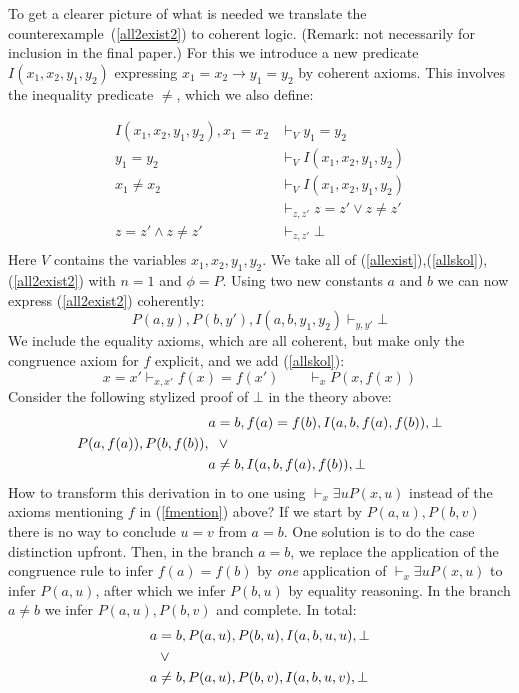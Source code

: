 \documentclass[10pt,a4paper]{article}
\begin{document}
To get a clearer picture of what is needed we translate the 
counterexample~(\ref{all2exist2}) to coherent logic.
(Remark: not necessarily for inclusion in the final paper.)
For this we introduce a new predicate $I(x_1,x_2,y_1,y_2)$
expressing $x_1=x_2 \to y_1=y_2$ by coherent axioms.
This involves the inequality predicate ${\neq}$, which we also define:

\begin{align*}
 I(x_1,x_2,y_1,y_2), x_1=x_2 & \vdash_V                 y_1=y_2\\
 y_1=y_2                                  &\vdash_V                 I(x_1,x_2,y_1,y_2)\\ 
 x_1\neq x_2                           &\vdash_V                 I(x_1,x_2,y_1,y_2)\\
                                                 &\vdash_{z,z'}           z=z' \lor z\neq z'\\
 z=z' \land z\neq z'                &\vdash_{z,z'}           \bot\\
\end{align*}
Here $V$ contains the variables $x_1,x_2,y_1,y_2$.
We take all of (\ref{allexist}),(\ref{allskol}),(\ref{all2exist2})
with $n=1$ and $\phi=P$.
Using two new constants $a$ and $b$ we can now express (\ref{all2exist2}) coherently:
\[
P(a,y),P(b,y'),I(a,b,y_1,y_2)  \vdash_{y,y'} \bot
\]
We include the equality axioms, which are all coherent, but make only the
congruence axiom for $f$ explicit, and we add (\ref{allskol}):
\begin{equation}\label{fmention}
x=x'\vdash_{x,x'} f(x) = f(x') \quad\quad \vdash_{x} P(x,f(x))
\end{equation}
Consider the following stylized proof of $\bot$ in the theory above:
\begin{align*}
& a=b,f(a)=f(b),I(a,b,f(a),f(b)),\bot\\
P(a,f(a)), P(b,f(b)),&{\hphantom w} \lor\\
& a\neq b,I(a,b,f(a),f(b)),\bot\\
\end{align*}
How to transform this derivation in to one using 
$\vdash_{x} \exists u P(x,u)$ instead of the axioms mentioning $f$ 
in (\ref{fmention}) above? If we start by $P(a,u), P(b,v)$
there is no way to conclude $u=v$ from $a=b$. 
One solution is to do the case distinction upfront. 
Then, in the branch $a=b$, we replace the application of the congruence
rule to infer $f(a)=f(b)$ by \emph{one} application of 
$\vdash_{x} \exists u P(x,u)$ to infer $P(a,u)$, after which
we infer $P(b,u)$ by equality reasoning. 
In the branch $a\neq b$ we infer $P(a,u),P(b,v)$ and complete. In total:
\begin{align*}
& a=b,P(a,u),P(b,u),I(a,b,u,u),\bot\\
&{\hphantom w}\lor\\
& a\neq b,P(a,u), P(b,v),I(a,b,u,v),\bot\\
\end{align*}
\end{document}
